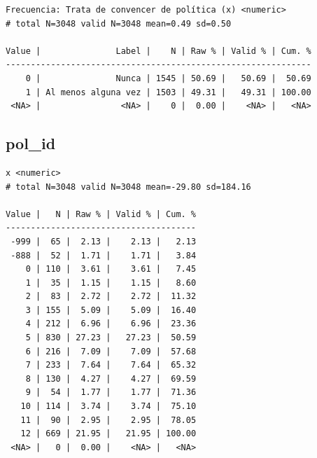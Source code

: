 \documentclass[
  letterpaper,
  DIV=11,
  numbers=noendperiod]{scrreprt}
\newenvironment{Shaded}{\begin{snugshade}}{\end{snugshade}}
\newcommand{\FunctionTok}[1]{\textcolor[rgb]{0.28,0.35,0.67}{#1}}
\newcommand{\NormalTok}[1]{\textcolor[rgb]{0.00,0.23,0.31}{#1}}
\newcommand{\SpecialCharTok}[1]{\textcolor[rgb]{0.37,0.37,0.37}{#1}}
\begin{document}
\begin{verbatim}
Frecuencia: Trata de convencer de política (x) <numeric> 
# total N=3048 valid N=3048 mean=0.49 sd=0.50

Value |               Label |    N | Raw % | Valid % | Cum. %
-------------------------------------------------------------
    0 |               Nunca | 1545 | 50.69 |   50.69 |  50.69
    1 | Al menos alguna vez | 1503 | 49.31 |   49.31 | 100.00
 <NA> |                <NA> |    0 |  0.00 |    <NA> |   <NA>
\end{verbatim}

\hypertarget{pol_id}{%
\subsection{pol\_id}\label{pol_id}}

\begin{Shaded}
\end{Shaded}

\begin{verbatim}
x <numeric> 
# total N=3048 valid N=3048 mean=-29.80 sd=184.16

Value |   N | Raw % | Valid % | Cum. %
--------------------------------------
 -999 |  65 |  2.13 |    2.13 |   2.13
 -888 |  52 |  1.71 |    1.71 |   3.84
    0 | 110 |  3.61 |    3.61 |   7.45
    1 |  35 |  1.15 |    1.15 |   8.60
    2 |  83 |  2.72 |    2.72 |  11.32
    3 | 155 |  5.09 |    5.09 |  16.40
    4 | 212 |  6.96 |    6.96 |  23.36
    5 | 830 | 27.23 |   27.23 |  50.59
    6 | 216 |  7.09 |    7.09 |  57.68
    7 | 233 |  7.64 |    7.64 |  65.32
    8 | 130 |  4.27 |    4.27 |  69.59
    9 |  54 |  1.77 |    1.77 |  71.36
   10 | 114 |  3.74 |    3.74 |  75.10
   11 |  90 |  2.95 |    2.95 |  78.05
   12 | 669 | 21.95 |   21.95 | 100.00
 <NA> |   0 |  0.00 |    <NA> |   <NA>
\end{verbatim}
\end{document}
